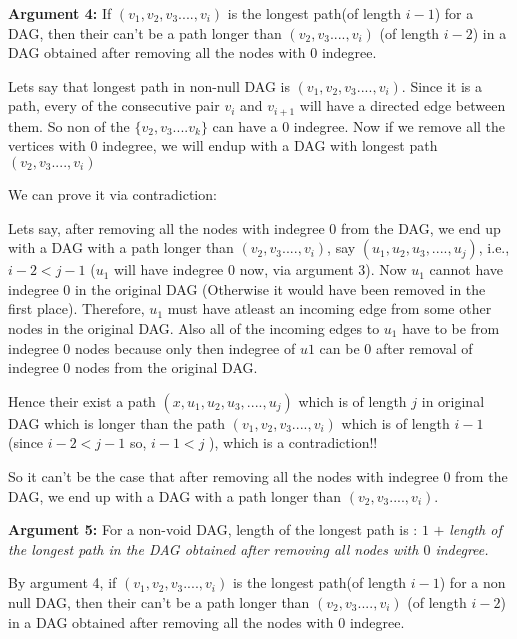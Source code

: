\documentclass[answers]{exam}
\begin{document}
\begin{questions}
\begin{solution}
\par

\textbf{Argument 4:} If $(v_1,v_2,v_3....,v_i)$ is the longest path(of length $i-1$) for a DAG, then their can't be a path longer than $(v_2,v_3....,v_i)$ (of length $i-2$)  in a DAG obtained after removing all the nodes with $0$ indegree.\par

 Lets say that longest path in non-null DAG is $(v_1,v_2,v_3....,v_i)$. Since it is a path, every of the consecutive pair $v_i$ and $v_{i+1}$ will have a directed edge between them. So non of the $\{v_2,v_3....v_k\}$ can have a $0$ indegree. Now if we remove all the vertices with $0$ indegree, we will endup with a DAG with longest path $(v_2,v_3....,v_i)$ \par

 We can prove it via contradiction:

Lets say, after removing all the nodes with indegree $0$ from the DAG, we end up with a DAG with a path longer than $(v_2,v_3....,v_i)$, say $(u_1,u_2,u_3,....,u_j)$, i.e., $i-2<j-1$ ($u_1$ will have indegree $0$ now, via argument 3). Now $u_1$ cannot have indegree $0$ in the original DAG (Otherwise it would have been removed in the first place). Therefore, $u_1$ must have atleast an incoming edge from some other nodes in the original DAG. Also all of the incoming edges to $u_1$ have to be from indegree $0$ nodes because only then indegree of $u1$ can be $0$ after removal of indegree $0$ nodes from the original DAG. \par
Hence their exist a path $(x,u_1,u_2,u_3,....,u_j) $ which is of length $j$ in original DAG which is longer than the path $(v_1,v_2,v_3....,v_i)$ which is of length $i-1$ (since $i-2<j-1$ so, $i-1<j$  ), which is a contradiction!!\par

So it can't be the case that after removing all the nodes with indegree $0$ from the DAG, we end up with a DAG with a path longer than $(v_2,v_3....,v_i)$.

\par
\textbf{Argument 5:} For a non-void DAG, length of the longest path is : $1$ $+$ \textit{length of the longest path in the DAG obtained after removing all nodes with $0$ indegree.}  \par

By argument 4, if $(v_1,v_2,v_3....,v_i)$ is the longest path(of length $i-1$) for a non null DAG, then their can't be a path longer than $(v_2,v_3....,v_i)$ (of length $i-2$)  in a DAG obtained after removing all the nodes with $0$ indegree.\par


\end{solution}
\end{questions}
\end{document}
